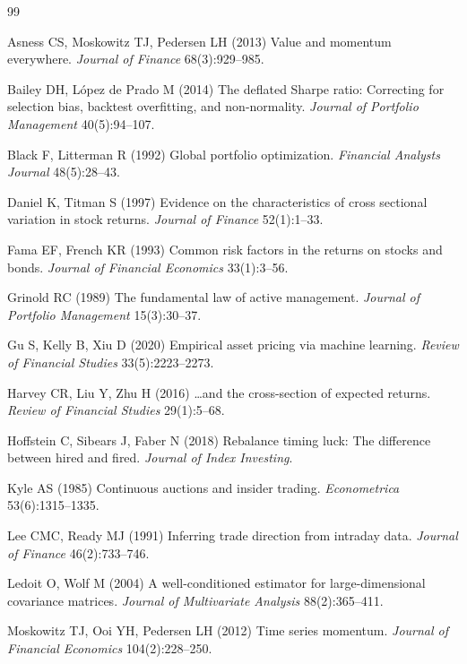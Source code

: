 \documentclass[11pt,letterpaper]{article}
\begin{document}
\newpage
\begin{thebibliography}{99}

 Asness CS, Moskowitz TJ, Pedersen LH (2013) Value and momentum everywhere. \emph{Journal of Finance} 68(3):929--985.

 Bailey DH, L\'opez de Prado M (2014) The deflated Sharpe ratio: Correcting for selection bias, backtest overfitting, and non-normality. \emph{Journal of Portfolio Management} 40(5):94--107.

 Black F, Litterman R (1992) Global portfolio optimization. \emph{Financial Analysts Journal} 48(5):28--43.

 Daniel K, Titman S (1997) Evidence on the characteristics of cross sectional variation in stock returns. \emph{Journal of Finance} 52(1):1--33.

 Fama EF, French KR (1993) Common risk factors in the returns on stocks and bonds. \emph{Journal of Financial Economics} 33(1):3--56.

 Grinold RC (1989) The fundamental law of active management. \emph{Journal of Portfolio Management} 15(3):30--37.

 Gu S, Kelly B, Xiu D (2020) Empirical asset pricing via machine learning. \emph{Review of Financial Studies} 33(5):2223--2273.

 Harvey CR, Liu Y, Zhu H (2016) \ldots and the cross-section of expected returns. \emph{Review of Financial Studies} 29(1):5--68.

 Hoffstein C, Sibears J, Faber N (2018) Rebalance timing luck: The difference between hired and fired. \emph{Journal of Index Investing}.

 Kyle AS (1985) Continuous auctions and insider trading. \emph{Econometrica} 53(6):1315--1335.

 Lee CMC, Ready MJ (1991) Inferring trade direction from intraday data. \emph{Journal of Finance} 46(2):733--746.

 Ledoit O, Wolf M (2004) A well-conditioned estimator for large-dimensional covariance matrices. \emph{Journal of Multivariate Analysis} 88(2):365--411.

 Moskowitz TJ, Ooi YH, Pedersen LH (2012) Time series momentum. \emph{Journal of Financial Economics} 104(2):228--250.

\end{thebibliography}
\end{document}
